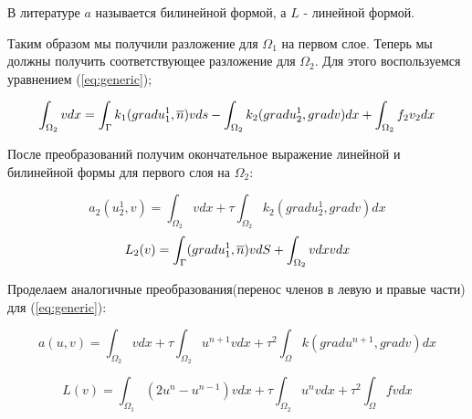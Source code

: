В литературе $a$ называется билинейной формой, а $L$ - линейной формой.

Таким образом мы получили разложение для $\Omega_1$ на первом слое. Теперь мы должны получить соответствующее разложение для $\Omega_2$. Для этого воспользуемся уравнением (\ref{eq:generic});

$$ \int_{\Omega_2}vdx = \int_{\Gamma}k_1(gradu_1^1, \overline{n})vds - \int_{\Omega_2}k_2(gradu_2^1, gradv)dx + \int_{\Omega_2}f_2v_2dx $$

После преобразований получим окончательное выражение линейной и билинейной формы для первого слоя на $\Omega_2$:

$$ a_2(u_2^1, v) = \int_{\Omega_2}vdx + \tau\int_{\Omega_2}^{}k_2(gradu_2^1, gradv)dx $$
$$ L_2(v) = \int_{\Gamma}(gradu_1^1, \overline{n})vdS + \int_{\Omega_2}^{}vdx vdx$$

Проделаем аналогичные преобразования(перенос членов в левую и правые части) для (\ref{eq:generic}):

\begin{equation}
    a(u, v) = \int_{\Omega_2}^{}vdx + \tau\int_{\Omega_2}^{}u^{n+1}vdx + \tau^2\int_{\Omega}^{}k(gradu^{n+1}, gradv)dx
    \label{eq:a-variational-generic}
\end{equation}

\begin{equation}
    L(v) = \int_{\Omega_1}^{}(2u^n - u^{n-1})vdx + \tau\int_{\Omega_2}^{}u^nvdx + \tau^2\int_{\Omega}^{}fvdx   
    \label{}
\end{equation}
